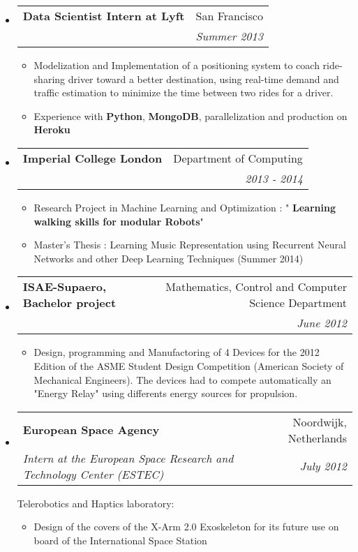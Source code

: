 \documentclass[letterpaper,11pt]{article}
\makeatletter
\newcommand{\resitem}[1]{\item #1 \vspace{-2pt}}
\newcommand{\ressubheading}[4]{
\begin{tabular*}{6.5in}{l@{\cftdotfill{\cftsecdotsep}\extracolsep{\fill}}r}
		\textbf{#1} & #2 \\
		\textit{#3} & \textit{#4} \\
\end{tabular*}\vspace{-6pt}}
\makeatother
\begin{document}
\begin{itemize}
    \item
\ressubheading{Data Scientist Intern at Lyft}{San Francisco}{}{Summer 2013}
    \begin{itemize}
        \item Modelization and Implementation of a positioning system to coach ride-sharing driver toward a better destination, using real-time demand and traffic estimation to minimize the time between two rides for a driver.
        \item Experience with \textbf{Python}, \textbf{MongoDB}, parallelization and production on \textbf{Heroku}
    \end{itemize}


    \item
\ressubheading{Imperial College London}{Department of Computing}{}{2013 - 2014}
    \begin{itemize}

        \item Research Project in Machine Learning and Optimization : " \textbf{Learning walking skills for modular Robots}"
        \item Master's Thesis : Learning Music Representation using Recurrent Neural Networks and other Deep Learning Techniques (Summer 2014)
    \end{itemize}



\item
	\ressubheading{ISAE-Supaero, Bachelor project}{Mathematics, Control and Computer Science Department}{}{June 2012}
		\begin{itemize}
\item Design, programming and Manufactoring of 4 Devices for the 2012 Edition of the ASME Student Design Competition (American Society of Mechanical Engineers). The devices had to compete automatically an "Energy Relay" using differents energy sources for propulsion.
	\end{itemize}


\item
	\ressubheading{European Space Agency}{Noordwijk, Netherlands}{ Intern at the European Space Research and Technology Center (ESTEC)}{July 2012}
\vspace{0.2cm}

Telerobotics and Haptics laboratory:
	\begin{itemize}
		\resitem{Design of the covers of the X-Arm 2.0 Exoskeleton for its future use on board of the International Space Station }
	\end{itemize}
\end{itemize}
\end{document}
